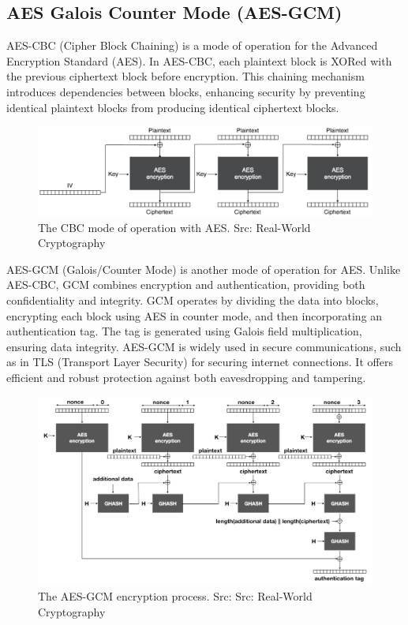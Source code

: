 \documentclass[runningheads]{llncs}
\begin{document}
\newpage
\subsection{AES Galois Counter Mode (AES-GCM)}

AES-CBC (Cipher Block Chaining) is a mode of operation for the Advanced Encryption Standard (AES). In AES-CBC, each plaintext block is XORed with the previous ciphertext block before encryption. This chaining mechanism introduces dependencies between blocks, enhancing security by preventing identical plaintext blocks from producing identical ciphertext blocks.

\begin{figure}[ht] %
    \centering
    \includegraphics[scale=0.55]{resources/AES_CBC.png}
    \caption{The CBC mode of operation with AES. Src: Real-World Cryptography~\cite{book_real_world_crypto}}
\end{figure}

AES-GCM (Galois/Counter Mode) is another mode of operation for AES. Unlike AES-CBC, GCM combines encryption and authentication, providing both confidentiality and integrity. GCM operates by dividing the data into blocks, encrypting each block using AES in counter mode, and then incorporating an authentication tag. The tag is generated using Galois field multiplication, ensuring data integrity. AES-GCM is widely used in secure communications, such as in TLS (Transport Layer Security) for securing internet connections. It offers efficient and robust protection against both eavesdropping and tampering.

\begin{figure}[ht] %
    \centering
    \includegraphics[scale=0.55]{resources/AES_GCM.png}
    \caption{The AES-GCM encryption process. Src: Src: Real-World Cryptography~\cite{book_real_world_crypto}}
\end{figure}
\end{document}
